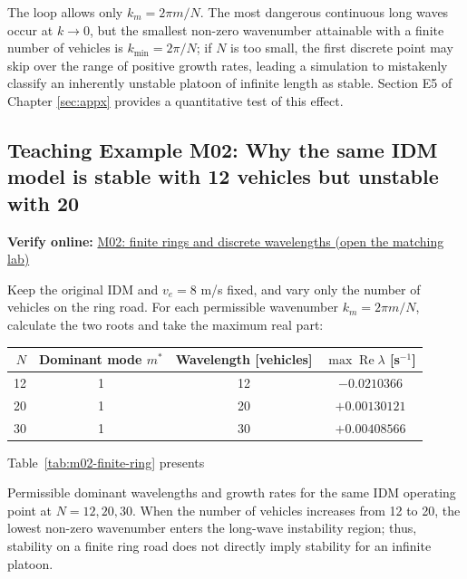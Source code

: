 \documentclass[11pt,a4paper,openany]{book}
\numberwithin{equation}{chapter}
\numberwithin{figure}{chapter}
\numberwithin{table}{chapter}
\newcommand{\tabletext}[2]{%
  \par\smallskip\noindent
  Table~\ref{#1} presents #2
\par\smallskip
}
\newcommand{\onlinelab}[2]{%
  \par\smallskip\noindent
  {\small\sffamily\color{teal}\textbf{Verify online: }\href{https://cwan-ucr.github.io/traffic-stability-book/lab/?case=#1}{#2 (open the matching lab)}}%
  \par\smallskip}
\begin{document}
\begin{tcolorbox}[notebox,title=\textbf{Why this instability might go "unnoticed" on a finite-sized loop}]
The loop allows only $k_m=2\pi m/N$. The most dangerous continuous long waves occur at $k\to0$, but the smallest non-zero wavenumber attainable with a finite number of vehicles is $k_{\min}=2\pi/N$; if $N$ is too small, the first discrete point may skip over the range of positive growth rates, leading a simulation to mistakenly classify an inherently unstable platoon of infinite length as stable. Section E5 of Chapter \ref{sec:appx} provides a quantitative test of this effect.\end{tcolorbox}

\subsection{Teaching Example M02: Why the same IDM model is stable with 12 vehicles but unstable with 20}
\onlinelab{M02}{M02: finite rings and discrete wavelengths}


\label{sub:m02-finite-ring}

Keep the original IDM and $v_e=8$ m/s fixed, and vary only the number of vehicles on the ring road. For each permissible wavenumber
$k_m=2\pi m/N$, calculate the two roots and take the maximum real part:


\begin{center}
\small
{}
\label{tab:m02-finite-ring}
\begin{tabular}{rccc}
\toprule
$N$ &

Dominant mode $m^*$

&

Wavelength [vehicles]

& $\max\operatorname{Re}\lambda$ [s$^{-1}$] \\
\midrule
12 & 1 & 12 & $-0.0210366$ \\
20 & 1 & 20 & $+0.00130121$ \\
30 & 1 & 30 & $+0.00408566$ \\
\bottomrule
\end{tabular}
\end{center}
\tabletext{tab:m02-finite-ring}{

Permissible dominant wavelengths and growth rates for the same IDM operating point at $N=12,20,30$. When the number of vehicles increases from 12 to 20, the lowest non-zero wavenumber enters the long-wave instability region; thus, stability on a finite ring road does not directly imply stability for an infinite platoon.
}
\end{document}
